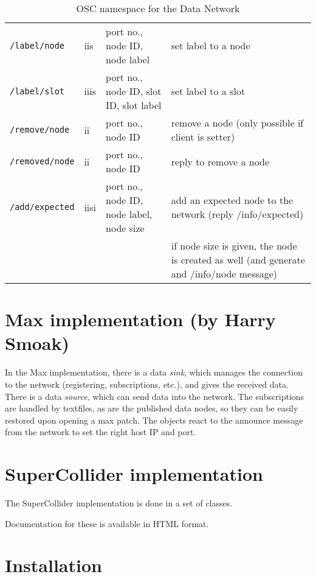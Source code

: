 \documentclass[letterpaper,10pt]{article}
\begin{document}
\begin{sidewaystable}[!tbp]
\begin{center}
\begin{tabular}{|llll|}
\verb|/label/node| & iis & port no., node ID, node label & set label to a node \\
\verb|/label/slot| & iiis & port no., node ID, slot ID, slot label & set label to a slot \\

\verb|/remove/node| & ii & port no., node ID & remove a node (only possible if client is setter) \\
\verb|/removed/node| & ii & port no., node ID & reply to remove a node \\

\verb|/add/expected| & iisi & port no., node ID, node label, node size & add an expected node to the network (reply /info/expected) \\
 &  &  & if node size is given, the node is created as well (and generate and /info/node message) \\
\hline
\end{tabular}
\end{center}
\caption{OSC namespace for the Data Network}
\label{oscinterface}
\end{sidewaystable}

\section{Max implementation (by Harry Smoak)}
In the Max implementation, there is a data \textit{sink}, which manages the connection to the network (registering, subscriptions, etc.), and gives the received data. There is a data \textit{source}, which can send data into the network. The subscriptions are handled by textfiles, as are the published data nodes, so they can be easily restored upon opening a max patch.
The objects react to the announce message from the network to set the right host IP and port.

\section{SuperCollider implementation}

The SuperCollider implementation is done in a set of classes.

Documentation for these is available in HTML format.


\section{Installation}
\end{document}

